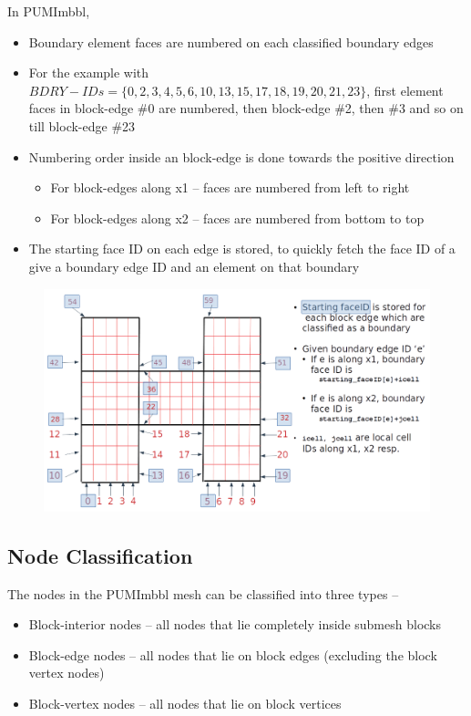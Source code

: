 \documentclass[a4paper,12pt]{article}
\begin{document}
In PUMImbbl,
\begin{itemize}
	\item Boundary element faces are numbered on each classified boundary edges
	\item For the example with $BDRY-IDs = \{0,2,3,4,5,6,10,13,15,17,18,19,20,21,23\}$, first element faces in block-edge \#0 are numbered, then block-edge \#2, then \#3 and so on till block-edge \#23
	\item Numbering order inside an block-edge is done towards the positive direction
	\begin{itemize}
		\item For block-edges along x1 – faces are numbered from left to right
		\item For block-edges along x2 – faces are numbered from bottom to top
	\end{itemize}
	\item The starting face ID on each edge is stored, to quickly fetch the face ID of a give a boundary edge ID and an element on that boundary
\end{itemize}
\begin{figure}[H]
	\centering
	\includegraphics[scale=0.4]{figures/bdry_face_pumi.png}
\end{figure}

\subsection{Node Classification}
The nodes in the PUMImbbl mesh can be classified into three types --
\begin{itemize}
	\item Block-interior nodes -- all nodes that lie completely inside submesh blocks
	\item Block-edge nodes -- all nodes that lie on block edges (excluding the block vertex nodes)
	\item Block-vertex nodes -- all nodes that lie on block vertices
\end{itemize} 
\end{document}
